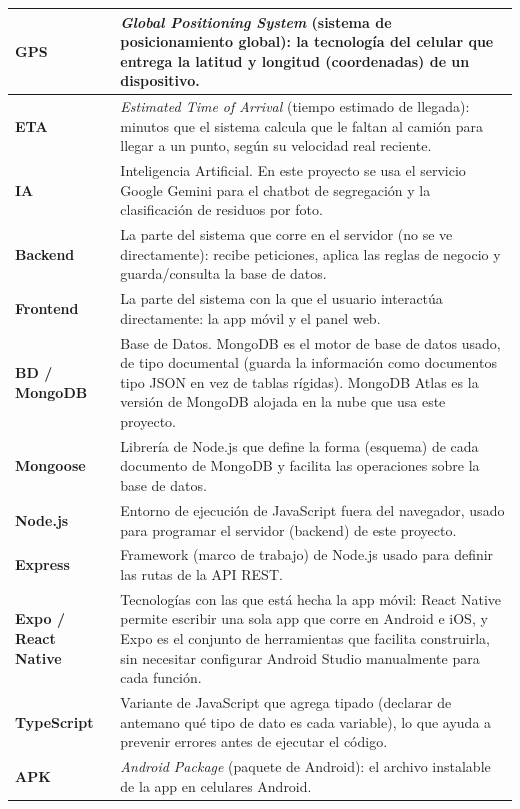 \documentclass[11pt,a4paper]{article}
\begin{document}
\begin{longtable}{|p{3.2cm}|p{11cm}|}
\hline
\textbf{GPS} & \textit{Global Positioning System} (sistema de posicionamiento global): la tecnología del celular que entrega la latitud y longitud (coordenadas) de un dispositivo. \\
\hline
\textbf{ETA} & \textit{Estimated Time of Arrival} (tiempo estimado de llegada): minutos que el sistema calcula que le faltan al camión para llegar a un punto, según su velocidad real reciente. \\
\hline
\textbf{IA} & Inteligencia Artificial. En este proyecto se usa el servicio Google Gemini para el chatbot de segregación y la clasificación de residuos por foto. \\
\hline
\textbf{Backend} & La parte del sistema que corre en el servidor (no se ve directamente): recibe peticiones, aplica las reglas de negocio y guarda/consulta la base de datos. \\
\hline
\textbf{Frontend} & La parte del sistema con la que el usuario interactúa directamente: la app móvil y el panel web. \\
\hline
\textbf{BD / MongoDB} & Base de Datos. MongoDB es el motor de base de datos usado, de tipo documental (guarda la información como documentos tipo JSON en vez de tablas rígidas). MongoDB Atlas es la versión de MongoDB alojada en la nube que usa este proyecto. \\
\hline
\textbf{Mongoose} & Librería de Node.js que define la forma (esquema) de cada documento de MongoDB y facilita las operaciones sobre la base de datos. \\
\hline
\textbf{Node.js} & Entorno de ejecución de JavaScript fuera del navegador, usado para programar el servidor (backend) de este proyecto. \\
\hline
\textbf{Express} & Framework (marco de trabajo) de Node.js usado para definir las rutas de la API REST. \\
\hline
\textbf{Expo / React Native} & Tecnologías con las que está hecha la app móvil: React Native permite escribir una sola app que corre en Android e iOS, y Expo es el conjunto de herramientas que facilita construirla, sin necesitar configurar Android Studio manualmente para cada función. \\
\hline
\textbf{TypeScript} & Variante de JavaScript que agrega tipado (declarar de antemano qué tipo de dato es cada variable), lo que ayuda a prevenir errores antes de ejecutar el código. \\
\hline
\textbf{APK} & \textit{Android Package} (paquete de Android): el archivo instalable de la app en celulares Android. \\

\end{longtable}
\end{document}
